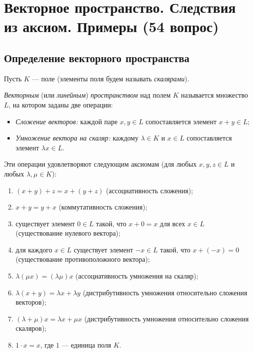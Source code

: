 \documentclass[a4paper,12pt]{article}
\theoremstyle{definition}
\theoremstyle{plain}
\theoremstyle{remark}
\begin{document}
	
	\newpage
	\section{Векторное пространство. Следствия из аксиом. Примеры (54 вопрос)}
	
	\subsection{Определение векторного пространства}
	
	Пусть \( K \) — поле (элементы поля будем называть \textit{скалярами}).
	
	\begin{tcolorbox}[colback=blue!5, colframe=blue!40!black, title=Определение]
		\textit{Векторным} (или \textit{линейным}) \textit{пространством} над полем \( K \) называется множество \( L \), на котором заданы две операции:
		\begin{itemize}
			\item \textit{Сложение векторов:} каждой паре \( x, y \in L \) сопоставляется элемент \( x + y \in L \);
			\item \textit{Умножение вектора на скаляр:} каждому \( \lambda \in K \) и \( x \in L \) сопоставляется элемент \( \lambda x \in L \).
		\end{itemize}
		Эти операции удовлетворяют следующим аксиомам (для любых \( x, y, z \in L \) и любых \( \lambda, \mu \in K \)):
		\begin{enumerate}
			\item \( (x + y) + z = x + (y + z) \) (ассоциативность сложения);
			\item \( x + y = y + x \) (коммутативность сложения);
			\item существует элемент \( 0 \in L \) такой, что \( x + 0 = x \) для всех \( x \in L \) (существование нулевого вектора);
			\item для каждого \( x \in L \) существует элемент \( -x \in L \) такой, что \( x + (-x) = 0 \) (существование противоположного вектора);
			\item \( \lambda (\mu x) = (\lambda \mu) x \) (ассоциативность умножения на скаляр);
			\item \( \lambda (x + y) = \lambda x + \lambda y \) (дистрибутивность умножения относительно сложения векторов);
			\item \( (\lambda + \mu) x = \lambda x + \mu x \) (дистрибутивность умножения относительно сложения скаляров);
			\item \( 1 \cdot x = x \), где \( 1 \) — единица поля \( K \).
		\end{enumerate}
	\end{tcolorbox}
	
\end{document}
